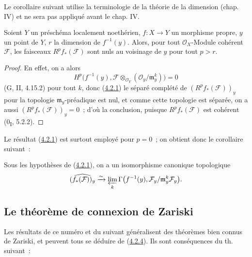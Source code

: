 Le corollaire suivant utilise la terminologie de la théorie de la dimension
(chap. IV) et ne sera pas appliqué avant le chap. IV.

\begin{corollary}[4.2.2]
\label{III.4.2.2-fr}
Soient $Y$ un préschéma localement noethérien, $f:X\to Y$ un morphisme
propre, $y$ un point de $Y$, $r$ la dimension de $f^{-1}(y)$. Alors, pour
tout $\mathcal O_X$-Module cohérent $\mathcal F$, les faisceaux
$R^pf_*(\mathcal F)$ sont nuls au voisinage de $y$ pour tout $p>r$.
\end{corollary}

\begin{proof}
En effet, on a alors
\[
H^p\bigl(f^{-1}(y),
\mathcal F\otimes_{\mathcal O_Y}(\mathcal O_y/\mathfrak m_y^k)\bigr)=0
\]
(G, II, 4.15.2) pour tout $k$, donc
(\hyperref[III.4.2.1-fr]{4.2.1}) le séparé complété de
$(R^pf_*(\mathcal F))_y$ pour la topologie $\mathfrak m_y$-préadique est
nul, et comme cette topologie est séparée, on a aussi
$(R^pf_*(\mathcal F))_y=0$~; d'où la conclusion, puisque
$R^pf_*(\mathcal F)$ est cohérent (0\textsubscript{I}, 5.2.2).
\end{proof}

\begin{env}[4.2.3]
\label{III.4.2.3-fr}
Le résultat (\hyperref[III.4.2.1-fr]{4.2.1}) est surtout employé pour
$p=0$~; on obtient donc le corollaire suivant~:
\end{env}

\begin{corollary}[4.2.4]
\label{III.4.2.4-fr}
Sous les hypothèses de (\hyperref[III.4.2.1-fr]{4.2.1}), on a un
isomorphisme canonique topologique
\[
\widehat{(f_*(\mathcal F))_y}
\xrightarrow{\sim}
\varprojlim_k\Gamma\bigl(f^{-1}(y),
\mathcal F_y/\mathfrak m_y^k\mathcal F_y\bigr).
\]
\end{corollary}

\subsection{Le théorème de connexion de Zariski}
\label{subsection:III.4.3-fr}
\label{III.4.3-fr}

Les résultats de ce numéro et du suivant généralisent des théorèmes bien
connus de Zariski, et peuvent tous se déduire de
(\hyperref[III.4.2.4-fr]{4.2.4}). Ils sont conséquences du th. suivant~:


